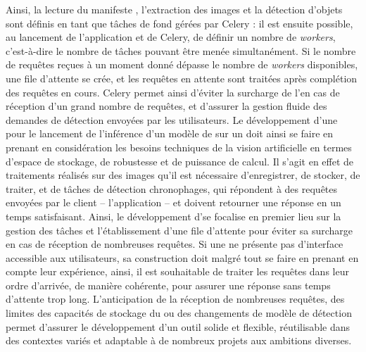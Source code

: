 	Ainsi, la lecture du manifeste \iiif, l'extraction des images et la détection d'objets sont définis en tant que tâches de fond gérées par Celery : il est ensuite possible, au lancement de l'application et de Celery, de définir un nombre de \textit{workers}, c'est-à-dire le nombre de tâches pouvant être menée simultanément. Si le nombre de requêtes reçues à un moment donné dépasse le nombre de \textit{workers} disponibles, une file d'attente se crée, et les requêtes en attente sont traitées après complétion des requêtes en cours. Celery permet ainsi d'éviter la surcharge de l'\api en cas de réception d'un grand nombre de requêtes, et d'assurer la gestion fluide des demandes de détection envoyées par les utilisateurs.
	Le développement d'une \api pour le lancement de l'inférence d'un modèle de \dl sur un \gpu doit ainsi se faire en prenant en considération les besoins techniques de la vision artificielle en termes d'espace de stockage, de robustesse et de puissance de calcul. Il s'agit en effet de traitements réalisés sur des images qu'il est nécessaire d'enregistrer, de stocker, de traiter, et de tâches de détection chronophages, qui répondent à des requêtes envoyées par le client -- l'application -- et doivent retourner une réponse en un temps satisfaisant. Ainsi, le développement d'\exapi se focalise en premier lieu sur la gestion des tâches et l'établissement d'une file d'attente pour éviter sa surcharge en cas de réception de nombreuses requêtes. Si une \api ne présente pas d'interface accessible aux utilisateurs, sa construction doit malgré tout se faire en prenant en compte leur expérience, ainsi, il est souhaitable de traiter les requêtes dans leur ordre d'arrivée, de manière cohérente, pour assurer une réponse sans temps d'attente trop long. L'anticipation de la réception de nombreuses requêtes, des limites des capacités de stockage du \gpu ou des changements de modèle de détection permet d'assurer le développement d'un outil solide et flexible, réutilisable dans des contextes variés et adaptable à de nombreux projets aux ambitions diverses.
